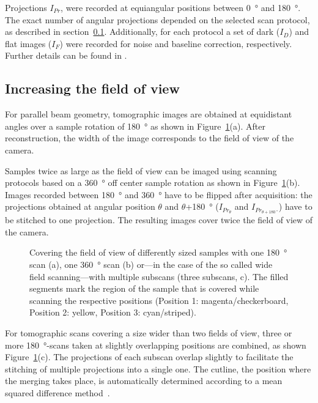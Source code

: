 Projections $I_{Pr}$, were recorded at equiangular positions between \SI{0}{\degree} and \SI{180}{\degree}. The exact number of angular projections depended on the selected scan protocol, as described in section~\ref{subsec:increasing the field of view}. Additionally, for each protocol a set of dark ($I_{D}$) and flat images ($I_{F}$) were recorded for noise and baseline correction, respectively. Further details can be found in 
\ifhtml
	\citet{Hintermueller2010}
\else
\fi%
.

\subsection{Increasing the field of view}\label{subsec:increasing the field of view}
For parallel beam geometry, tomographic images are obtained at equidistant angles over a sample rotation of \SI{180}{\degree} as shown in Figure~\ref{fig:scanning-possibilities}(a). After reconstruction, the width of the image corresponds to the field of view of the camera.

Samples twice as large as the field of view can be imaged using scanning protocols based on a \SI{360}{\degree} off center sample rotation as shown in Figure~\ref{fig:scanning-possibilities}(b). Images recorded between \SI{180}{\degree} and \SI{360}{\degree} have to be flipped after acquisition: the projections obtained at angular position $\theta$ and $\theta$+\SI{180}{\degree} ($I_{Pr_{\theta}}$ and $I_{Pr_{\theta+\SI{180}{\degree}}}$) have to be stitched to one projection. The resulting images cover twice the field of view of the camera.

\begin{figure}
	\centering
	\caption{Covering the field of view of differently sized samples with one \SI{180}{\degree} scan (a), one \SI{360}{\degree} scan (b) or---in the case of the so called wide field scanning---with multiple subscans (three subscans, c). The filled segments mark the region of the sample that is covered while scanning the respective positions (Position 1: magenta/checkerboard, Position 2: yellow, Position 3: cyan/striped).}%
	\ifiucr		
	\else
	\fi
	\label{fig:scanning-possibilities}%
\end{figure}

For tomographic scans covering a size wider than two fields of view, three or more \SI{180}{\degree}-scans taken at slightly overlapping positions are combined, as shown Figure~\ref{fig:scanning-possibilities}(c). The projections of each subscan overlap slightly to facilitate the stitching of multiple projections into a single one. The cutline, \ie the position where the merging takes place, is automatically determined according to a mean squared difference method~\cite{Hintermueller2010}.

